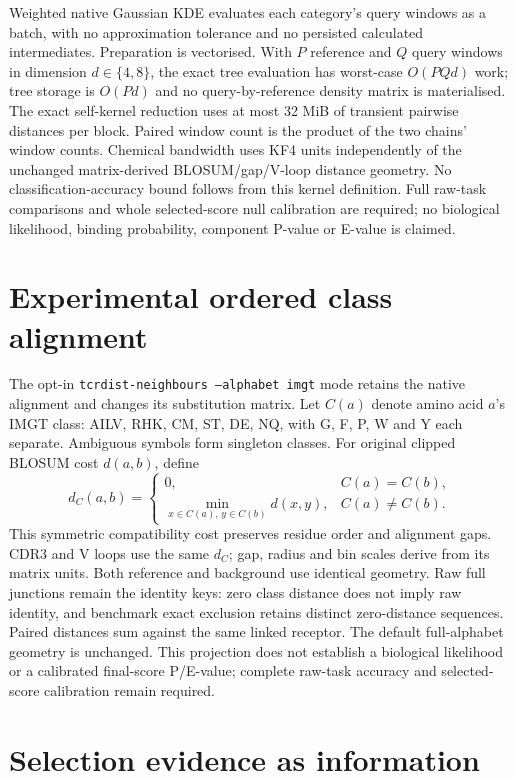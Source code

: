 \documentclass[10pt,a4paper]{article}
\theoremstyle{definition}
\newcommand{\code}[1]{\texttt{\small #1}}
\begin{document}
Weighted native Gaussian KDE evaluates each category's query windows as a batch,
with no approximation tolerance and no persisted calculated intermediates.
Preparation is vectorised. With $P$ reference and $Q$ query windows in dimension
$d\in\{4,8\}$, the exact tree evaluation has worst-case $O(PQd)$ work; tree storage
is $O(Pd)$ and no query-by-reference density matrix is materialised. The exact
self-kernel reduction uses at most 32 MiB of transient pairwise distances per
block. Paired window count is the product of the two chains' window counts.
Chemical bandwidth uses KF4 units independently of the unchanged matrix-derived
BLOSUM/gap/V-loop distance geometry. No classification-accuracy bound follows
from this kernel definition. Full raw-task comparisons and whole selected-score
null calibration are required; no biological likelihood, binding probability,
component P-value or E-value is claimed.

\section{Experimental ordered class alignment}
The opt-in \code{tcrdist-neighbours --alphabet imgt} mode retains the native
alignment and changes its substitution matrix. Let $C(a)$ denote amino acid
$a$'s IMGT class: AILV, RHK, CM, ST, DE, NQ, with G, F, P, W and Y each separate.
Ambiguous symbols form singleton classes. For original clipped BLOSUM cost
$d(a,b)$, define
\[
d_C(a,b)=\begin{cases}
0,& C(a)=C(b),\\
\min_{x\in C(a),\,y\in C(b)}d(x,y),& C(a)\ne C(b).
\end{cases}
\]
This symmetric compatibility cost preserves residue order and alignment gaps.
CDR3 and V loops use the same $d_C$; gap, radius and bin scales derive from its
matrix units. Both reference and background use identical geometry.
Raw full junctions remain the identity keys: zero class distance does not imply
raw identity, and benchmark exact exclusion retains distinct zero-distance
sequences. Paired distances sum against the same linked receptor.
The default full-alphabet geometry is unchanged. This projection does not
establish a biological likelihood or a calibrated final-score P/E-value;
complete raw-task accuracy and selected-score calibration remain required.

\section{Selection evidence as information}
\label{sec:selection-information}
\end{document}
